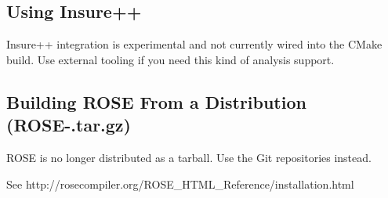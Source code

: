 \subsection{Using Insure++}
\label{gettingStarted:insure}

   Insure++ integration is experimental and not currently wired into the CMake build.
Use external tooling if you need this kind of analysis support.



\subsection{Building ROSE From a Distribution (ROSE-\VersionNumber.tar.gz)}
\label{gettingStarted:UserInstructions}

ROSE is no longer distributed as a tarball. Use the Git repositories
instead.

See http://rosecompiler.org/ROSE\_HTML\_Reference/installation.html

